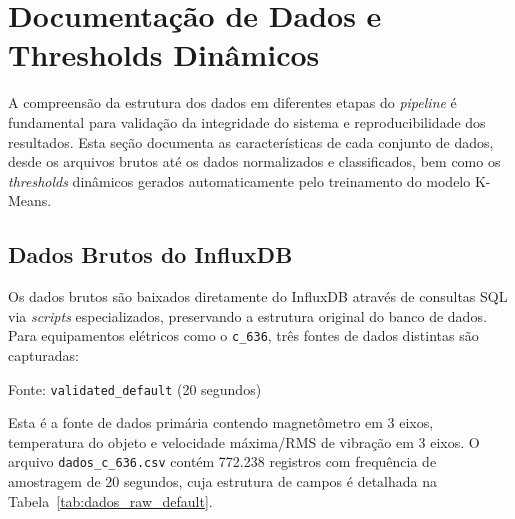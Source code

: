 \newpage
\section{Documentação de Dados e Thresholds Dinâmicos}
\label{sec:estrutura_dados}

A compreensão da estrutura dos dados em diferentes etapas do \textit{pipeline} é fundamental para validação da integridade do sistema e reproducibilidade dos resultados. Esta seção documenta as características de cada conjunto de dados, desde os arquivos brutos até os dados normalizados e classificados, bem como os \textit{thresholds} dinâmicos gerados automaticamente pelo treinamento do modelo K-Means.

\subsection{Dados Brutos do InfluxDB}

Os dados brutos são baixados diretamente do InfluxDB através de consultas SQL via \textit{scripts} especializados, preservando a estrutura original do banco de dados. Para equipamentos elétricos como o \texttt{c\_636}, três fontes de dados distintas são capturadas:

Fonte: \texttt{validated\_default} (20 segundos)

Esta é a fonte de dados primária contendo magnetômetro em 3 eixos, temperatura do objeto e velocidade máxima/RMS de vibração em 3 eixos. O arquivo \texttt{dados\_c\_636.csv} contém 772.238 registros com frequência de amostragem de 20 segundos, cuja estrutura de campos é detalhada na Tabela~\ref{tab:dados_raw_default}.

